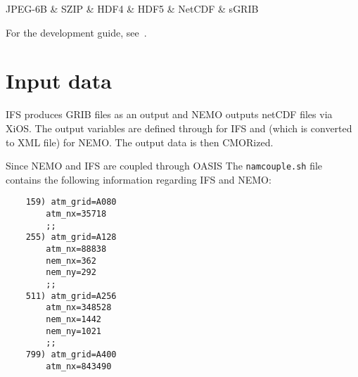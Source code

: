 \begin{dependency}
\begin{deptext}
JPEG-6B \& SZIP \& HDF4 \& HDF5 \& NetCDF \& sGRIB \\
\end{deptext}
\end{dependency}

For the development guide, see~\cite{dev-guide}.


\section{Input data}
\gls{IFS} produces \gls{GRIB} files as an output and \gls{NEMO} outputs \gls{netCDF} files via XiOS. 
The output variables are defined through  for IFS and  (which is converted to XML file) for \gls{NEMO}.
The output data is then \gls{CMOR}ized.

Since \gls{NEMO} and \gls{IFS} are coupled through OASIS \cite{TM673}
The \texttt{namcouple.sh} file contains the following information regarding \gls{IFS} and \gls{NEMO}:

\begin{lstlisting}
    159) atm_grid=A080
        atm_nx=35718
        ;;
    255) atm_grid=A128
        atm_nx=88838
        nem_nx=362
        nem_ny=292
        ;;
    511) atm_grid=A256
        atm_nx=348528
        nem_nx=1442
        nem_ny=1021
        ;;
    799) atm_grid=A400
        atm_nx=843490  
\end{lstlisting}







